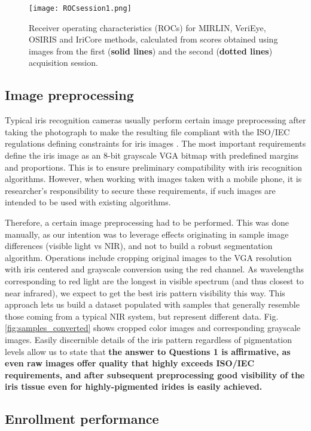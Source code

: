 \documentclass[10pt,twocolumn,letterpaper]{article}
\begin{document}
\begin{figure*}[!t]
\centering
\texttt{[image: ROCsession1.png]}
\vskip0.2cm
\caption{Receiver operating characteristics (ROCs) for MIRLIN, VeriEye, OSIRIS and IriCore methods, calculated from scores obtained using images from the first (\textbf{solid lines}) and the second (\textbf{dotted lines}) acquisition session.}
\label{fig:ROC_session1}
\end{figure*} 

\subsection{Image preprocessing}
Typical iris recognition cameras usually perform certain image preprocessing after taking the photograph to make the resulting file compliant with the ISO/IEC regulations defining constraints for iris images \cite{ISO}\cite{ISO2}. The most important requirements define the iris image as an 8-bit grayscale VGA bitmap with predefined margins and proportions. This is to ensure preliminary compatibility with iris recognition algorithms. However, when working with images taken with a mobile phone, it is researcher's responsibility to secure these requirements, if such images are intended to be used with existing algorithms.

Therefore, a certain image preprocessing had to be performed. This was done manually, as our intention was to leverage effects originating in sample image differences (visible light vs NIR), and not to build a robust segmentation algorithm. Operations include cropping original images to the VGA resolution with iris centered and grayscale conversion using the red channel. As wavelengths corresponding to red light are the longest in visible spectrum (and thus closest to near infrared), we expect to get the best iris pattern visibility this way. This approach lets us build a dataset populated with samples that generally resemble those coming from a typical NIR system, but represent different data. Fig. \ref{fig:samples_converted} shows cropped color images and corresponding grayscale images. Easily discernible details of the iris pattern regardless of pigmentation levels allow us to state that \textbf{the answer to Questions 1 is affirmative, as even raw images offer quality that highly exceeds ISO/IEC requirements, and after subsequent preprocessing good visibility of the iris tissue even for highly-pigmented irides is easily achieved.} 

\subsection{Enrollment performance}
\end{document}
